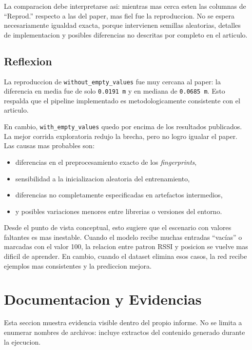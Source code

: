 \documentclass[11pt,a4paper]{article}
\begin{document}
La comparacion debe interpretarse asi: mientras mas cerca esten las columnas de ``Reprod.'' respecto a las del paper, mas fiel fue la reproduccion. No se espera necesariamente igualdad exacta, porque intervienen semillas aleatorias, detalles de implementacion y posibles diferencias no descritas por completo en el articulo.

\subsection{Reflexion}
La reproduccion de \texttt{without\_empty\_values} fue muy cercana al paper: la diferencia en media fue de solo \texttt{0.0191 m} y en mediana de \texttt{0.0685 m}. Esto respalda que el pipeline implementado es metodologicamente consistente con el articulo.

En cambio, \texttt{with\_empty\_values} quedo por encima de los resultados publicados. La mejor corrida exploratoria redujo la brecha, pero no logro igualar el paper. Las causas mas probables son:
\begin{itemize}
\item diferencias en el preprocesamiento exacto de los \textit{fingerprints},
\item sensibilidad a la inicializacion aleatoria del entrenamiento,
\item diferencias no completamente especificadas en artefactos intermedios,
\item y posibles variaciones menores entre librerias o versiones del entorno.
\end{itemize}

Desde el punto de vista conceptual, esto sugiere que el escenario con valores faltantes es mas inestable. Cuando el modelo recibe muchas entradas ``vacías'' o marcadas con el valor 100, la relacion entre patron RSSI y posicion se vuelve mas dificil de aprender. En cambio, cuando el dataset elimina esos casos, la red recibe ejemplos mas consistentes y la prediccion mejora.

\section{Documentacion y Evidencias}
Esta seccion muestra evidencia visible dentro del propio informe. No se limita a enumerar nombres de archivos: incluye extractos del contenido generado durante la ejecucion.
\end{document}
